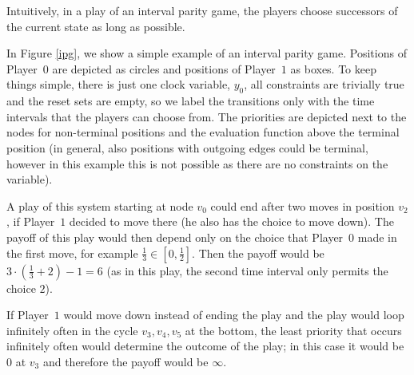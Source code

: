 \documentclass[fleqn,envcountsame]{LMCS}
\newcommand{\pzero}{Player~$0$\xspace}
\newcommand{\pone}{Player~$1$\xspace}
\begin{document}
Intuitively, in a play of an interval parity game, the players choose
successors of the current state as long as possible.
\begin{exa}
In Figure \ref{ipg}, we show a simple example of an interval parity game.
Positions of \pzero are depicted as circles and positions of \pone
as boxes. To keep things simple, there is just one clock variable, 
$y_0$, all constraints are trivially true and the reset
sets are empty, so we label the transitions only with the time intervals
that the players can choose from. 
The priorities are depicted next to the nodes for non-terminal
positions and the evaluation function above the terminal position (in general, also
positions with outgoing edges could be terminal, however in this example this is
not possible as there are no constraints on the variable).

A play of this system starting at node $v_0$ could end after two
moves in position $v_2$, if \pone decided to move there (he also has the choice to
move down). 
The payoff of this play would then
depend only on the choice that \pzero made in the first move, for example $\frac 1 3 \in [0, \frac 1 2]$. 
Then the payoff would be
$3 \cdot (\frac 1 3 + 2) - 1=6$ (as in this 
play, the second time interval only permits the choice $2$).

If \pone would move down instead
of ending the play and the play would loop infinitely often in the cycle $v_3, v_4, v_5$
at the bottom, the least priority that occurs infinitely often would 
determine the outcome of the play; in this case it would be 0 at $v_3$ and therefore
the payoff would be $\infty$.
\end{exa}
\end{document}
